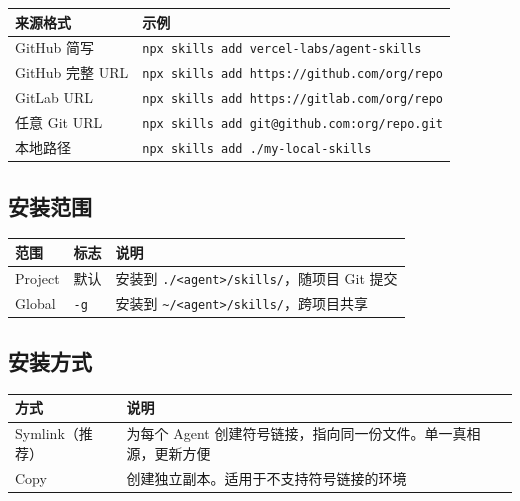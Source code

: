 \documentclass[11pt,a4paper]{article}
\begin{document}
\begin{table}[h]
\centering
\begin{tabularx}{\linewidth}{lX}
\toprule
\textbf{来源格式} & \textbf{示例} \\
\midrule
GitHub 简写 & \texttt{npx skills add vercel-labs/agent-skills} \\
GitHub 完整 URL & \texttt{npx skills add https://github.com/org/repo} \\
GitLab URL & \texttt{npx skills add https://gitlab.com/org/repo} \\
任意 Git URL & \texttt{npx skills add git@github.com:org/repo.git} \\
本地路径 & \texttt{npx skills add ./my-local-skills} \\
\bottomrule
\end{tabularx}
\end{table}

\subsection{安装范围}

\begin{table}[h]
\centering
\begin{tabularx}{\linewidth}{llX}
\toprule
\textbf{范围} & \textbf{标志} & \textbf{说明} \\
\midrule
Project & 默认 & 安装到 \texttt{./<agent>/skills/}，随项目 Git 提交 \\
Global & \texttt{-g} & 安装到 \texttt{\textasciitilde/<agent>/skills/}，跨项目共享 \\
\bottomrule
\end{tabularx}
\end{table}

\subsection{安装方式}

\begin{table}[h]
\centering
\begin{tabularx}{\linewidth}{lX}
\toprule
\textbf{方式} & \textbf{说明} \\
\midrule
Symlink（推荐） & 为每个 Agent 创建符号链接，指向同一份文件。单一真相源，更新方便 \\
Copy & 创建独立副本。适用于不支持符号链接的环境 \\
\bottomrule
\end{tabularx}
\end{table}
\end{document}
